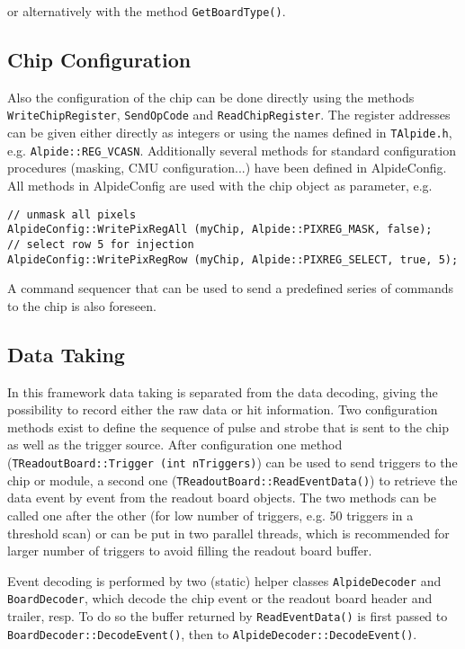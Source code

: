 \documentclass{article}
\begin{document}
or alternatively with the method \texttt{GetBoardType()}.


\subsection{Chip Configuration}

Also the configuration of the chip can be done directly using the
methods \texttt{WriteChipRegister}, \texttt{SendOpCode} and
\texttt{ReadChipRegister}. The register addresses can be given either
directly as integers or using the names defined in \texttt{TAlpide.h},
e.g. \texttt{Alpide::REG\_VCASN}. Additionally several methods for
standard configuration procedures (masking, CMU configuration...) have
been defined in AlpideConfig. All methods in AlpideConfig are used
with the chip object as parameter, e.g.
\begin{verbatim}
// unmask all pixels
AlpideConfig::WritePixRegAll (myChip, Alpide::PIXREG_MASK, false);
// select row 5 for injection 
AlpideConfig::WritePixRegRow (myChip, Alpide::PIXREG_SELECT, true, 5);
\end{verbatim}


A command sequencer that can be used to send a predefined series of
commands to the chip is also foreseen. 



\subsection {Data Taking}

In this framework data taking is separated from the data decoding,
giving the possibility to record either the raw data or hit
information. Two configuration methods exist to define the sequence of
pulse and strobe that is sent to the chip as well as the trigger
source. After configuration one method (\texttt{TReadoutBoard::Trigger (int
  nTriggers)}) can be used to send triggers to the chip
or module, a second one (\texttt{TReadoutBoard::ReadEventData()})
to retrieve the data event by event from the readout board objects. The two
methods can be called one after the other (for low number of triggers,
e.g. 50 triggers in a threshold scan) or can be put in two parallel
threads, which is recommended for larger number of triggers to avoid
filling the readout board buffer. 

Event decoding is performed by two (static) helper classes
\texttt{AlpideDecoder} and \texttt{BoardDecoder}, which decode the chip
event or the readout board header and trailer, resp. To do so the
buffer returned by \texttt{ReadEventData()} is first passed to
\texttt{BoardDecoder::DecodeEvent()}, then to
\texttt{AlpideDecoder::DecodeEvent()}. 
\end{document}
